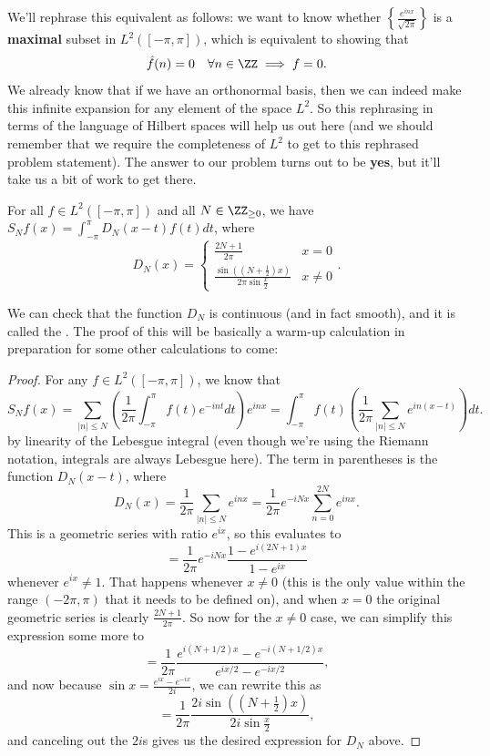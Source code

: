 We'll rephrase this equivalent as follows: we want to know whether $\left\{\frac{e^{inx}}{\sqrt{2\pi}}\right\}$ is a \textbf{maximal} subset in $L^2([-\pi, \pi])$, which is equivalent to showing that 
\[
    \hat{f}(n) = 0 \quad \forall n \in \ZZ \implies f = 0.
\]
We already know that if we have an orthonormal basis, then we can indeed make this infinite expansion for any element of the space $L^2$. So this rephrasing in terms of the language of Hilbert spaces will help us out here (and we should remember that we require the completeness of $L^2$ to get to this rephrased problem statement). The answer to our problem turns out to be \textbf{yes}, but it'll take us a bit of work to get there.

\begin{proposition}
For all $f \in L^2([-\pi, \pi])$ and all $N \in \ZZ_{\ge 0}$, we have $S_Nf(x) = \int_{-\pi}^{\pi} D_N(x-t) f(t) dt$, 
where
\[
    D_N(x) = \begin{cases} \frac{2N+1}{2\pi} & x = 0 \\ \frac{\sin\left(\left(N + \frac{1}{2}\right)x\right)}{2\pi \sin \frac{x}{2}} & x \ne 0 \end{cases}.
\]
\end{proposition}

We can check that the function $D_N$ is continuous (and in fact smooth), and it is called the . The proof of this will be basically a warm-up calculation in preparation for some other calculations to come:

\begin{proof}
For any $f \in L^2([-\pi, \pi])$, we know that 
\[
    S_N f(x) = \sum_{|n| \le N} \left(\frac{1}{2\pi} \int_{-\pi}^{\pi} f(t) e^{-int} dt\right) e^{inx} = \int_{-\pi}^\pi f(t) \left(\frac{1}{2\pi} \sum_{|n| \le N} e^{in(x-t)}\right) dt.
\]
by linearity of the Lebesgue integral (even though we're using the Riemann notation, integrals are always Lebesgue here). The term in parentheses is the function $D_N(x-t)$, where 
\[
    D_N(x) = \frac{1}{2\pi} \sum_{|n| \le N} e^{inx} = \frac{1}{2\pi} e^{-iNx} \sum_{n = 0}^{2N} e^{inx}.
\]
This is a geometric series with ratio $e^{ix}$, so this evaluates to 
\[
    = \frac{1}{2\pi} e^{-iNx} \frac{1 - e^{i(2N+1)x}}{1-e^{ix}}
\]
whenever $e^{ix} \ne 1$. That happens whenever $x \ne 0$ (this is the only value within the range $(-2\pi, \pi)$ that it needs to be defined on), and when $x = 0$ the original geometric series is clearly $\frac{2N+1}{2\pi}$. So now for the $x \ne 0$ case, we can simplify this expression some more to
\[
    = \frac{1}{2\pi} \frac{e^{i(N + 1/2)x} - e^{-i(N + 1/2)x}}{e^{ix/2}-e^{-ix/2}},
\]
and now because $\sin x = \frac{e^{ix} - e^{-ix}}{2i}$, we can rewrite this as
\[
    = \frac{1}{2\pi} \frac{2i \sin\left(\left(N + \frac{1}{2}\right) x\right)}{2i \sin \frac{x}{2}},
\]
and canceling out the $2i$s gives us the desired expression for $D_N$ above.
\end{proof}

